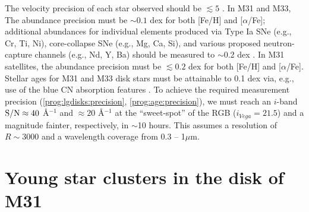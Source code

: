 \documentclass[11pt,a4paper,twoside,onecolumn,openany,final,oldfontcommands]{memoir}
\begin{document}
\medskip
\begin{sciencerequirement}
\reqitem The velocity precision of each star observed should be $\lesssim 5$ \kms.
\reqitem In M31 and M33, The abundance precision must be $\sim 0.1$ dex for both [Fe/H] and [$\alpha$/Fe]; additional abundances for individual elements produced via Type Ia SNe (e.g., Cr, Ti, Ni), core-collapse SNe (e.g., Mg, Ca, Si), and various proposed neutron-capture channels (e.g., Nd, Y, Ba) should be measured to $\sim$0.2 dex \citep[Fig.~\ref{fig:abundances_snr}; cf.][]{Sandford20}. \label{prog:lgdisks:precision}
\reqitem In M31 satellites, the abundance precision must be $\lesssim 0.2$ dex for both [Fe/H] and [$\alpha$/Fe].
\reqitem Stellar ages for M31 and M33 disk stars must be attainable to 0.1 dex via, e.g., use of the blue CN absorption features \citep[e.g.][]{Martig16,Ting19}.  %
\label{prog:age:precision}
\reqitem To achieve the required measurement precision (\ref{prog:lgdisks:precision}, \ref{prog:age:precision}), we must reach an $i$-band ${\rm S/N} \approx 40$ \AA$^{-1}$ and $\approx 20$ \AA$^{-1}$ at the  ``sweet-spot'' of the RGB ($i_{Vega} = 21.5$) and a magnitude fainter, respectively, in $\sim$10 hours.  This assumes a resolution of $R\sim3000$ and a wavelength coverage from 0.3 -- 1$\mu$m.
\end{sciencerequirement}

\section{Young star clusters in the disk of M31}
\end{document}
